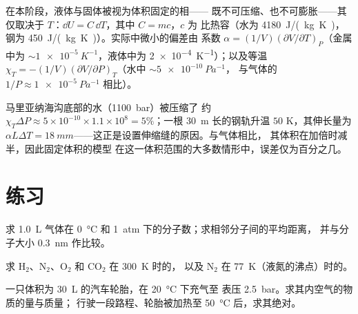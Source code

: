 \begin{proposition}\label{prop:b1:kinetic-theory:condensed}
在本阶段，液体与固体被视为体积固定的相——
既不可压缩、也不可膨胀——其
仅取决于 $T$：$\dd U = C\,\dd T$，其中 $C = mc$，$c$ 为
比热容（水为 \qty{4180}{J/(kg.K)}，钢为
\qty{450}{J/(kg.K)}）。实际中微小的偏差由
系数 $\alpha = (1/V)(\partial V/\partial T)_P$（金属中为
$\sim\qty{1e-5}{K^{-1}}$，液体中为 \qty{2e-4}{K^{-1}}）；以及等温
 $\chi_T = -(1/V)(\partial V/\partial P)_T$（水中 $\sim\qty{5e-10}{Pa^{-1}}$，
与气体的 $1/P \approx \qty{1e-5}{Pa^{-1}}$ 相比）。
\end{proposition}
\admitted

\begin{example}[水有多难压缩]\label{ex:b1:kinetic-theory:water}
马里亚纳海沟底部的水（\qty{1100}{bar}）被压缩了
约 $\chi_T\Delta P \approx 5\times10^{-10} \times 1.1\times10^8 = 5\%$；一根
\qty{30}{m} 长的钢轨升温 $50$ K，其伸长量为 $\alpha L\Delta T =
\qty{18}{mm}$——这正是设置伸缩缝的原因。与气体相比，
其体积在加倍时减半，因此固定体积的模型
在这一体积范围的大多数情形中，误差仅为百分之几。
\end{example}

\section{练习}

\begin{exercise}[$\star$]\label{exo:b1:kinetic-theory:1}
求 \qty{1.0}{L} 气体在 \qty{0}{\degreeCelsius} 和
\qty{1}{atm} 下的分子数；求相邻分子间的平均距离，
并与分子大小 \qty{0.3}{nm} 作比较。
\end{exercise}

\begin{exercise}[$\star$]\label{exo:b1:kinetic-theory:2}
求 H$_2$、N$_2$、O$_2$ 和 CO$_2$ 在 \qty{300}{K} 时的，
以及 N$_2$ 在 \qty{77}{K}（液氮的沸点）时的。
\end{exercise}

\begin{exercise}[$\star$]\label{exo:b1:kinetic-theory:3}
一只体积为 \qty{30}{L} 的汽车轮胎，在 \qty{20}{\degreeCelsius} 下充气至
表压 \qty{2.5}{bar}。求其内空气的物质的量与质量；
行驶一段路程、轮胎被加热至 \qty{50}{\degreeCelsius} 后，求其绝对。
\end{exercise}

